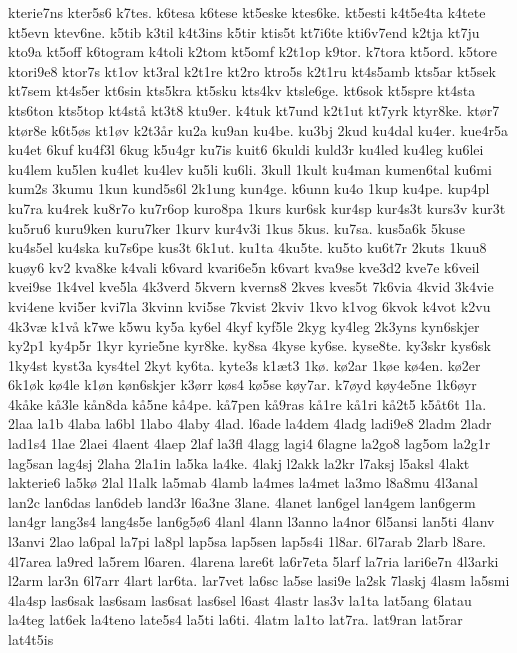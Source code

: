 {kterie7ns
kter5s6
k7tes.
k6tesa
k6tese
kt5eske
ktes6ke.
kt5esti
k4t5e4ta
k4tete
kt5evn
ktev6ne.
k5tib
k3til
k4t3ins
k5tir
ktis5t
kt7i6te
kti6v7end
k2tja
kt7ju
kto9a
kt5off
k6togram
k4toli
k2tom
kt5omf
k2t1op
k9tor.
k7tora
kt5ord.
k5tore
ktori9e8
ktor7s
kt1ov
kt3ral
k2t1re
kt2ro
ktro5s
k2t1ru
kt4s5amb
kts5ar
kt5sek
kt7sem
kt4s5er
kt6sin
kts5kra
kt5sku
kts4kv
ktsle6ge.
kt6sok
kt5spre
kt4sta
kts6ton
kts5top
kt4st^^e5
kt3t8
ktu9er.
k4tuk
kt7und
k2t1ut
kt7yrk
ktyr8ke.
kt^^f8r7
kt^^f8r8e
k6t5^^f8s
kt1^^f8v
k2t3^^e5r
ku2a
ku9an
ku4be.
ku3bj
2kud
ku4dal
ku4er.
kue4r5a
ku4et
6kuf
ku4f3l
6kug
k5u4gr
ku7is
kuit6
6kuldi
kuld3r
ku4led
ku4leg
ku6lei
ku4lem
ku5len
ku4let
ku4lev
ku5li
ku6li.
3kull
1kult
ku4man
kumen6tal
ku6mi
kum2s
3kumu
1kun
kund5s6l
2k1ung
kun4ge.
k6unn
ku4o
1kup
ku4pe.
kup4pl
ku7ra
ku4rek
ku8r7o
ku7r6op
kuro8pa
1kurs
kur6sk
kur4sp
kur4s3t
kurs3v
kur3t
ku5ru6
kuru9ken
kuru7ker
1kurv
kur4v3i
1kus
5kus.
ku7sa.
kus5a6k
5kuse
ku4s5el
ku4ska
ku7s6pe
kus3t
6k1ut.
ku1ta
4ku5te.
ku5to
ku6t7r
2kuts
1kuu8
ku^^f8y6
kv2
kva8ke
k4vali
k6vard
kvari6e5n
k6vart
kva9se
kve3d2
kve7e
k6veil
kvei9se
1k4vel
kve5la
4k3verd
5kvern
kverns8
2kves
kves5t
7k6via
4kvid
3k4vie
kvi4ene
kvi5er
kvi7la
3kvinn
kvi5se
7kvist
2kviv
1kvo
k1vog
6kvok
k4vot
k2vu
4k3v^^e6
k1v^^e5
k7we
k5wu
ky5a
ky6el
4kyf
kyf5le
2kyg
ky4leg
2k3yns
kyn6skjer
ky2p1
ky4p5r
1kyr
kyrie5ne
kyr8ke.
ky8sa
4kyse
ky6se.
kyse8te.
ky3skr
kys6sk
1ky4st
kyst3a
kys4tel
2kyt
ky6ta.
kyte3s
k1^^e6t3
1k^^f8.
k^^f82ar
1k^^f8e
k^^f84en.
k^^f82er
6k1^^f8k
k^^f84le
k1^^f8n
k^^f8n6skjer
k3^^f8rr
k^^f8s4
k^^f85se
k^^f8y7ar.
k7^^f8yd
k^^f8y4e5ne
1k6^^f8yr
4k^^e5ke
k^^e53le
k^^e5n8da
k^^e55ne
k^^e54pe.
k^^e57pen
k^^e59ras
k^^e51re
k^^e51ri
k^^e52t5
k5^^e5t6t
1la.
2laa
la1b
4laba
la6bl
1labo
4laby
4lad.
l6ade
la4dem
4ladg
ladi9e8
2ladm
2ladr
lad1s4
1lae
2laei
4laent
4laep
2laf
la3fl
4lagg
lagi4
6lagne
la2go8
lag5om
la2g1r
lag5san
lag4sj
2laha
2la1in
la5ka
la4ke.
4lakj
l2akk
la2kr
l7aksj
l5aksl
4lakt
lakterie6
la5k^^f8
2lal
l1alk
la5mab
4lamb
la4mes
la4met
la3mo
l8a8mu
4l3anal
lan2c
lan6das
lan6deb
land3r
l6a3ne
3lane.
4lanet
lan6gel
lan4gem
lan6germ
lan4gr
lang3s4
lang4s5e
lan6g5^^f86
4lanl
4lann
l3anno
la4nor
6l5ansi
lan5ti
4lanv
l3anvi
2lao
la6pal
la7pi
la8pl
lap5sa
lap5sen
lap5s4i
1l8ar.
6l7arab
2larb
l8are.
4l7area
la9red
la5rem
l6aren.
4larena
lare6t
la6r7eta
5larf
la7ria
lari6e7n
4l3arki
l2arm
lar3n
6l7arr
4lart
lar6ta.
lar7vet
la6sc
la5se
lasi9e
la2sk
7laskj
4lasm
la5smi
4la4sp
las6sak
las6sam
las6sat
las6sel
l6ast
4lastr
las3v
la1ta
lat5ang
6latau
la4teg
lat6ek
la4teno
late5s4
la5ti
la6ti.
4latm
la1to
lat7ra.
lat9ran
lat5rar
lat4t5is
}

